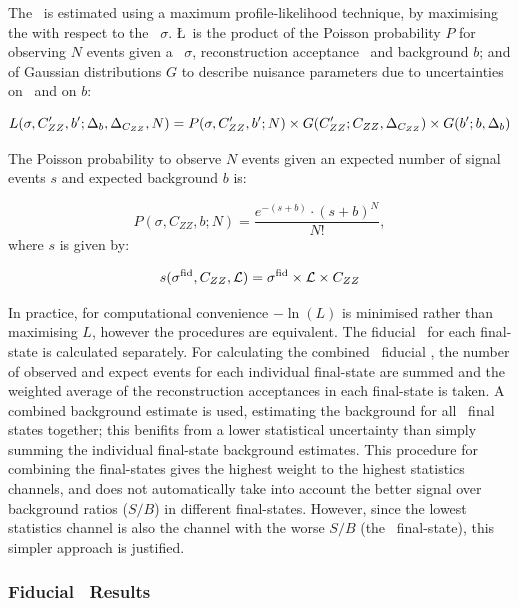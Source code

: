 The \cx\ is estimated using a maximum profile-likelihood technique, by
maximising the  with respect to the \cx\
$\sigma$.
\L\ is the product of the Poisson probability $P$ for observing $N$ events given a
\cx\ $\sigma$, reconstruction acceptance \CZZ\ and background $b$; and of Gaussian
distributions $G$ to describe nuisance parameters due to uncertainties on \CZZ\
and on $b$:

\begin{equation}
\small
   L(\sigma, C_{ZZ}', b'; \Delta_{b}, \Delta_{C_{ZZ}}, N) = P(\sigma, C_{ZZ}^\prime,
   b^\prime; N)\times G(C_{ZZ}^\prime; C_{ZZ}, \Delta_{C_{ZZ}}) \times G(b^\prime; b, \Delta_{b})
\end{equation}

The Poisson probability to observe $N$ events given an expected
number of signal events $s$ and expected background $b$ is:

\begin{equation}
P(\sigma, C_{ZZ}, b; N) =
\frac{e^{-(s+b)}\cdot
     \left(s+b\right)^{N}}
     {N!},
\end{equation}
where $s$ is given by:

\begin{equation}
   s(\sigma^{\rm fid}, C_{ZZ}, \mathcal{L}) = \sigma^{\rm fid}\times\mathcal{L}\times C_{ZZ} \\
\end{equation}

In practice, for computational convenience $-\ln(L)$ is minimised rather
than maximising $L$, however the procedures are equivalent. The fiducial
\cx\ for each final-state is calculated separately. For calculating the combined \ZZllll\
fiducial \cx, the number of observed and expect events for each individual
final-state are summed and the weighted average of the reconstruction
acceptances in each final-state is taken. A combined background estimate is used,
estimating the background for all \llll\ final states together; this benifits from a
lower statistical uncertainty than simply summing the individual final-state background
estimates. This procedure for combining the final-states gives the highest weight to the highest
statistics channels, and does not automatically take into account the better
signal over background ratios ($S/B$) in different final-states. However, since the
lowest statistics channel is also the channel with the worse $S/B$ (the \eeee\
final-state), this simpler approach is justified.

\subsubsection{Fiducial \CX\ Results}

